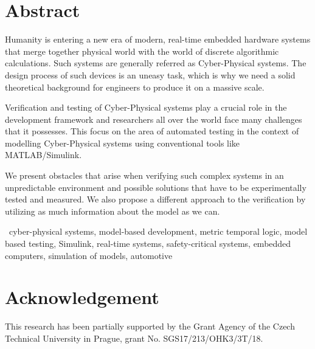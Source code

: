 \section*{Abstract}

Humanity is entering a new era of modern, real-time embedded hardware systems that merge together physical world with the world of discrete algorithmic calculations. Such systems are generally referred as Cyber-Physical systems. The design process of such devices is an uneasy task, which is why we need a solid theoretical background for engineers to produce it on a massive scale.

Verification and testing of Cyber-Physical systems play a crucial role in the development framework and researchers all over the world face many challenges that it possesses. This \thesis{} focus on the area of automated testing in the context of modelling Cyber-Physical systems using conventional tools like MATLAB/Simulink.

We present obstacles that arise when verifying such complex systems in an unpredictable environment and possible solutions that have to be experimentally tested and measured. We also propose a different approach to the verification by utilizing as much information about the model as we can.

\bigskip


~cyber-physical systems, model-based development, metric temporal logic, model based testing, Simulink, real-time systems, safety-critical systems, embedded
computers, simulation of models, automotive

\vfill

\section*{Acknowledgement}
This research has been partially supported 
by the Grant Agency of the Czech Technical University in Prague, grant No. SGS17/213/OHK3/3T/18.